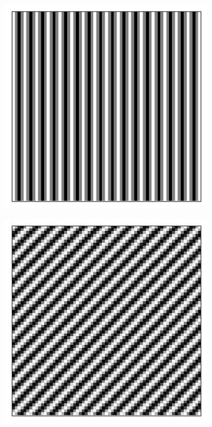\begin{figure}[h]
	\centering
	\begin{subfigure}[t]{0.3\textwidth}
		\centering
		\includegraphics[width=\linewidth]{images/fringes_1_kx_16_ky_0.png}
		\caption{}
		\label{fig:fringes_1}
	\end{subfigure}
	\begin{subfigure}[t]{0.3\textwidth}
		\centering
		\includegraphics[width=\linewidth]{images/fringes_2_kx_12_ky_12.png}

\end{subfigure}
\end{figure}
